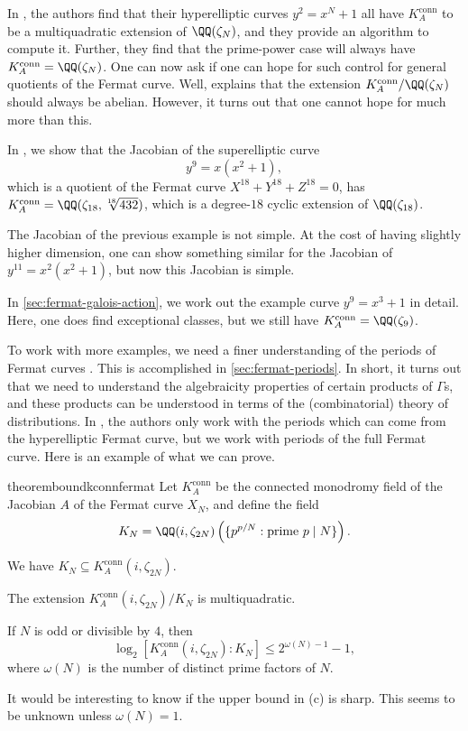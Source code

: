 \documentclass[openany]{book}
\begin{document}
In \cite[Theorem~7.1.1]{ggl-fermat}, the authors find that their hyperelliptic curves $y^2=x^N+1$ all have $K_A^{\mathrm{conn}}$ to be a multiquadratic extension of $\QQ(\zeta_N)$, and they provide an algorithm to compute it. Further, they find that the prime-power case will always have $K_A^{\mathrm{conn}}=\QQ(\zeta_N)$. One can now ask if one can hope for such control for general quotients of the Fermat curve. Well, \cite[Theorem~7.15]{deligne-hodge} explains that the extension $K_A^{\mathrm{conn}}/\QQ(\zeta_N)$ should always be abelian. However, it turns out that one cannot hope for much more than this.
\begin{example}
	In , we show that the Jacobian of the superelliptic curve
	\[y^9=x\left(x^2+1\right),\]
	which is a quotient of the Fermat curve $X^{18}+Y^{18}+Z^{18}=0$, has $K_A^{\mathrm{conn}}=\QQ(\zeta_{18},\sqrt[18]{432})$, which is a degree-$18$ cyclic extension of $\QQ(\zeta_{18})$.
\end{example}
\begin{example}
	The Jacobian of the previous example is not simple. At the cost of having slightly higher dimension, one can show something similar for the Jacobian of $y^{11}=x^2\left(x^2+1\right)$, but now this Jacobian is simple.
\end{example}
In \cref{sec:fermat-galois-action}, we work out the example curve $y^9=x^3+1$ in detail. Here, one does find exceptional classes, but we still have $K_A^{\mathrm{conn}}=\QQ(\zeta_9)$.

To work with more examples, we need a finer understanding of the periods of Fermat curves \cite[Sections~6.3--6.4]{ggl-fermat}. This is accomplished in \cref{sec:fermat-periods}. In short, it turns out that we need to understand the algebraicity properties of certain products of $\Gamma$s, and these products can be understood in terms of the (combinatorial) theory of distributions. In \cite{ggl-fermat}, the authors only work with the periods which can come from the hyperelliptic Fermat curve, but we work with periods of the full Fermat curve. Here is an example of what we can prove.
\begin{restatable*}{theorem}{boundkconnfermat} \label{thm:bound-k-conn-fermat}
	Let $K^{\mathrm{conn}}_A$ be the connected monodromy field of the Jacobian $A$ of the Fermat curve $X_N$, and define the field
	\[K_N=\QQ(i,\zeta_{2N})\left(\{p^{p/N}:\text{prime }p\mid N\}\right).\]
	\begin{listalph}
		\item We have $K_N\subseteq K^{\mathrm{conn}}_A(i,\zeta_{2N})$.
		\item The extension $K^{\mathrm{conn}}_A(i,\zeta_{2N})/K_N$ is multiquadratic.
		\item If $N$ is odd or divisible by $4$, then
		\[\log_2[K^{\mathrm{conn}}_A(i,\zeta_{2N}):K_N]\le2^{\omega(N)-1}-1,\]
		where $\omega(N)$ is the number of distinct prime factors of $N$.
	\end{listalph}
\end{restatable*}
\begin{remark}
	It would be interesting to know if the upper bound in (c) is sharp. This seems to be unknown unless $\omega(N)=1$.
\end{remark}
\end{document}
